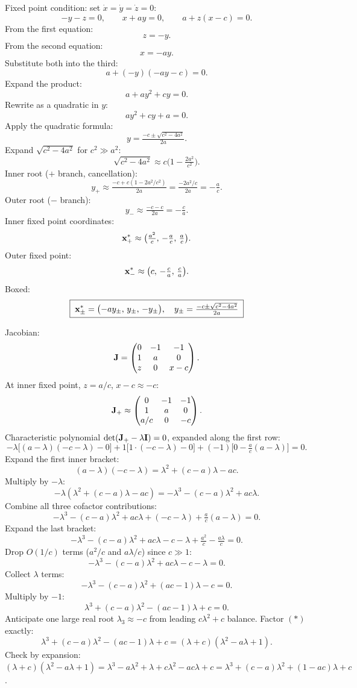 \documentclass[11pt]{article}
\begin{document}
Fixed point condition: set $\dot x = \dot y = \dot z = 0$:
\[
-y - z = 0,\qquad x + ay = 0,\qquad a + z(x-c) = 0.
\]
From the first equation:
\[
z = -y.
\]
From the second equation:
\[
x = -ay.
\]
Substitute both into the third:
\[
a + (-y)(-ay - c) = 0.
\]
Expand the product:
\[
a + a y^2 + c y = 0.
\]
Rewrite as a quadratic in $y$:
\[
a y^2 + c y + a = 0.
\]
Apply the quadratic formula:
\[
y = \tfrac{-c\pm\sqrt{c^2 - 4a^2}}{2a}.
\]
Expand $\sqrt{c^2-4a^2}$ for $c^2\gg a^2$:
\[
\sqrt{c^2 - 4a^2}\approx c\bigl(1 - \tfrac{2a^2}{c^2}\bigr).
\]
Inner root ($+$ branch, cancellation):
\[
y_+ \approx \tfrac{-c + c(1-2a^2/c^2)}{2a} = \tfrac{-2a^2/c}{2a} = -\tfrac{a}{c}.
\]
Outer root ($-$ branch):
\[
y_- \approx \tfrac{-c - c}{2a} = -\tfrac{c}{a}.
\]
Inner fixed point coordinates:
\[
\vb x_+^\ast \approx \bigl(\tfrac{a^2}{c},\,-\tfrac{a}{c},\,\tfrac{a}{c}\bigr).
\]
Outer fixed point:
\[
\vb x_-^\ast \approx \bigl(c,\,-\tfrac{c}{a},\,\tfrac{c}{a}\bigr).
\]
Boxed:
\[
\boxed{\;\vb x_\pm^\ast = \bigl(-ay_\pm,\,y_\pm,\,-y_\pm\bigr),\quad y_\pm = \tfrac{-c\pm\sqrt{c^2-4a^2}}{2a}\;}
\]

Jacobian:
\[
\vb J = \begin{pmatrix} 0 & -1 & -1 \\ 1 & a & 0 \\ z & 0 & x-c \end{pmatrix}.
\]
At inner fixed point, $z = a/c$, $x-c \approx -c$:
\[
\vb J_+ \approx \begin{pmatrix} 0 & -1 & -1 \\ 1 & a & 0 \\ a/c & 0 & -c \end{pmatrix}.
\]
Characteristic polynomial $\det(\vb J_+ - \lambda\vb I) = 0$, expanded along the first row:
\[
-\lambda\bigl[(a-\lambda)(-c-\lambda)-0\bigr] + 1\bigl[1\cdot(-c-\lambda) - 0\bigr] + (-1)\bigl[0 - \tfrac{a}{c}(a-\lambda)\bigr] = 0.
\]
Expand the first inner bracket:
\[
(a-\lambda)(-c-\lambda) = \lambda^2 + (c-a)\lambda - ac.
\]
Multiply by $-\lambda$:
\[
-\lambda(\lambda^2 + (c-a)\lambda - ac) = -\lambda^3 - (c-a)\lambda^2 + ac\lambda.
\]
Combine all three cofactor contributions:
\[
-\lambda^3 - (c-a)\lambda^2 + ac\lambda + (-c-\lambda) + \tfrac{a}{c}(a-\lambda) = 0.
\]
Expand the last bracket:
\[
-\lambda^3 - (c-a)\lambda^2 + ac\lambda - c - \lambda + \tfrac{a^2}{c} - \tfrac{a\lambda}{c} = 0.
\]
Drop $O(1/c)$ terms ($a^2/c$ and $a\lambda/c$) since $c\gg 1$:
\[
-\lambda^3 - (c-a)\lambda^2 + ac\lambda - c - \lambda = 0.
\]
Collect $\lambda$ terms:
\[
-\lambda^3 - (c-a)\lambda^2 + (ac-1)\lambda - c = 0.
\]
Multiply by $-1$:
\[
\lambda^3 + (c-a)\lambda^2 - (ac-1)\lambda + c = 0. \tag{$\ast$}
\]
Anticipate one large real root $\lambda_3 \approx -c$ from leading $c\lambda^2 + c$ balance. Factor $(\ast)$ exactly:
\[
\lambda^3 + (c-a)\lambda^2 - (ac-1)\lambda + c = (\lambda+c)(\lambda^2 - a\lambda + 1).
\]
Check by expansion: $(\lambda+c)(\lambda^2-a\lambda+1) = \lambda^3 -a\lambda^2 + \lambda + c\lambda^2 -ac\lambda + c = \lambda^3 + (c-a)\lambda^2 + (1-ac)\lambda + c$. \checkmark
\end{document}
